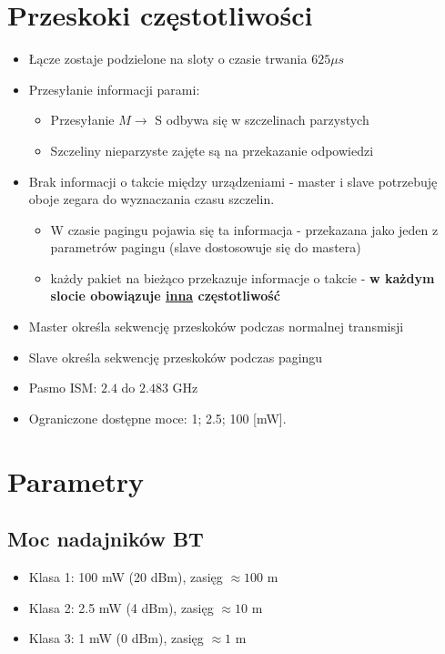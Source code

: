 \section{Przeskoki częstotliwości}
\begin{itemize}
	\item Łącze zostaje podzielone na sloty o czasie trwania $ 625 \mu s $
	\item Przesyłanie informacji parami:
	\begin{itemize}
		\item Przesyłanie $ M \rightarrow $ S odbywa się w szczelinach parzystych
		\item Szczeliny nieparzyste zajęte są na przekazanie odpowiedzi
	\end{itemize}
	\item Brak informacji o takcie między urządzeniami - master i slave potrzebuję oboje zegara do wyznaczania czasu szczelin.
	\begin{itemize}
		\item W czasie pagingu pojawia się ta informacja - przekazana jako jeden z parametrów pagingu (slave dostosowuje się do mastera)
		\item każdy pakiet na bieżąco przekazuje informacje o takcie - \textbf{w każdym slocie obowiązuje \underline{inna} częstotliwość}
	\end{itemize}
	\item Master określa sekwencję przeskoków podczas normalnej transmisji
	\item Slave określa sekwencję przeskoków podczas pagingu
	\item Pasmo ISM: $ 2.4 $ do $ 2.483 $ GHz
	\item Ograniczone dostępne moce: 1; 2.5; 100 [mW].
\end{itemize}

\section{Parametry}
\subsection{Moc nadajników BT}
\begin{itemize}
	\item Klasa 1: 100 mW (20 dBm), zasięg $ \approx 100 $ m
	\item Klasa 2: 2.5 mW (4 dBm), zasięg $ \approx 10 $ m
	\item Klasa 3: 1 mW (0 dBm), zasięg $ \approx 1 $ m
\end{itemize}
